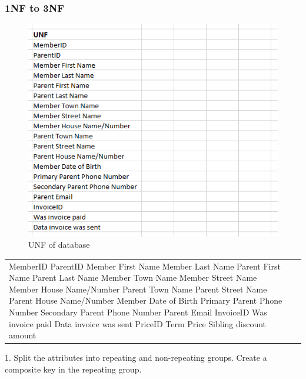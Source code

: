 \subsubsection{1NF to 3NF}

\begin{figure}[H]
\includegraphics[width=\textwidth]{./Design/images/UNF.png}
    \caption{UNF of database} \label{fig:UNF}
\end{figure}

\begin{center}
	\begin{tabular}{|p{4cm}|p{4cm}|}
		\hline
		MemberID
		ParentID
		Member First Name
		Member Last Name
		Parent First Name
		Parent Last Name
		Member Town Name
		Member Street Name
		Member House Name/Number
		Parent Town Name
		Parent Street Name
		Parent House Name/Number
		Member Date of Birth
		Primary Parent Phone Number
		Secondary Parent Phone Number
		Parent Email
		InvoiceID
		Was invoice paid
		Data invoice was sent
		PriceID
		Term Price
		Sibling discount amount
	\end{tabular}
\end{center}


1. Split the attributes into repeating and non-repeating groups. Create a composite key in the repeating group.

